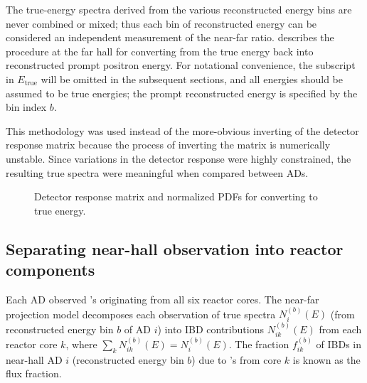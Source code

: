 The true-energy spectra derived from the various reconstructed energy bins
are never combined or mixed;
thus each bin of reconstructed energy can be considered an independent measurement
of the near-far ratio.
 describes the procedure at the far hall
for converting from the true \nuebar{} energy back into reconstructed prompt positron energy.
For notational convenience, the subscript in $E_{\text{true}}$ will be omitted
in the subsequent sections,
and all energies should be assumed to be true \nuebar{} energies;
the prompt reconstructed energy is specified by the bin index $b$.

This methodology was used instead of the more-obvious
inverting of the detector response matrix
because the process of inverting the matrix is numerically unstable.
Since variations in the detector response were highly constrained,
the resulting true \nuebar{} spectra were meaningful when compared between ADs.


\begin{figure}
    \caption{Detector response matrix and normalized PDFs
    for converting to true \nuebar{} energy.}
    \label{fig:drm}
\end{figure}


\subsection{Separating near-hall observation into reactor components}
\label{subsec:flux_fraction}

Each AD observed \nuebar{}'s originating from all six reactor cores.
The near-far projection model decomposes each observation
of true \nuebar{} spectra $N_i^{(b)}(E)$
(from reconstructed energy bin $b$ of AD $i$)
into IBD contributions $N_{ik}^{(b)}(E)$ from each reactor core $k$,
where $\sum_k N_{ik}^{(b)}(E) = N_i^{(b)}(E)$.
The fraction $f_{ik}^{(b)}$ of IBDs in near-hall AD $i$
(reconstructed energy bin $b$)
due to \nuebar{}'s from core $k$ is known as the flux fraction.

